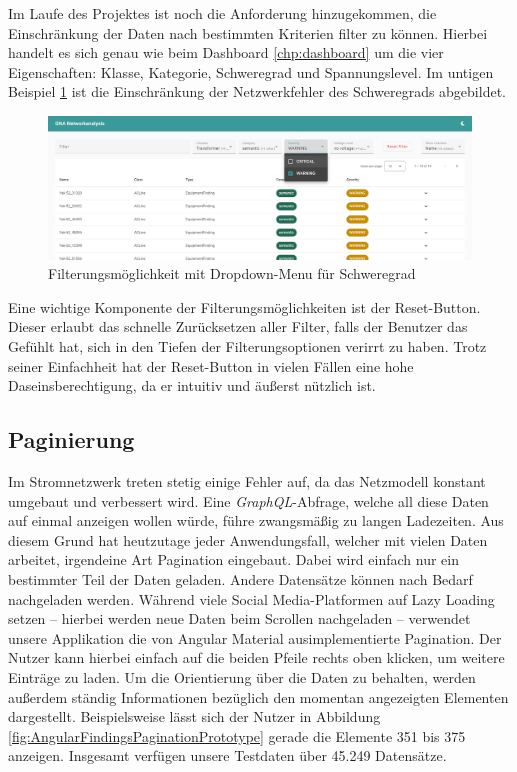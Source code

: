 Im Laufe des Projektes ist noch die Anforderung hinzugekommen, die Einschränkung der Daten nach bestimmten Kriterien filter zu können. Hierbei handelt es sich genau wie beim Dashboard \ref{chp:dashboard} um die vier Eigenschaften: Klasse, Kategorie, Schweregrad und Spannungslevel. Im untigen Beispiel \ref{fig:AngularFindingsFilteringSeverityPrototype} ist die Einschränkung der Netzwerkfehler des Schweregrads abgebildet.

\begin{figure}
    \centering
    \includegraphics[width=1\textwidth]{content/img/Empire/Frontend/Angular_Findings_Filtering_Severity_Prototype.png}
    \caption{Filterungsmöglichkeit mit Dropdown-Menu für Schweregrad}
    \label{fig:AngularFindingsFilteringSeverityPrototype}
\end{figure}
\FloatBarrier

Eine wichtige Komponente der Filterungsmöglichkeiten ist der Reset-Button. Dieser erlaubt das schnelle Zurücksetzen aller Filter, falls der Benutzer das Gefühlt hat, sich in den Tiefen der Filterungsoptionen verirrt zu haben. Trotz seiner Einfachheit hat der Reset-Button in vielen Fällen eine hohe Daseinsberechtigung, da er intuitiv und äußerst nützlich ist.

\subsection{Paginierung}

Im Stromnetzwerk treten stetig einige Fehler auf, da das Netzmodell konstant umgebaut und verbessert wird. Eine \emph{GraphQL}-Abfrage, welche all diese Daten auf einmal anzeigen wollen würde, führe zwangsmäßig zu langen Ladezeiten. Aus diesem Grund hat heutzutage jeder Anwendungsfall, welcher mit vielen Daten arbeitet, irgendeine Art Pagination eingebaut. Dabei wird einfach nur ein bestimmter Teil der Daten geladen. Andere Datensätze können nach Bedarf nachgeladen werden. Während viele Social Media-Platformen auf Lazy Loading setzen -- hierbei werden neue Daten beim Scrollen nachgeladen -- verwendet unsere Applikation die von Angular Material ausimplementierte Pagination. Der Nutzer kann hierbei einfach auf die beiden Pfeile rechts oben klicken, um weitere Einträge zu laden. Um die Orientierung über die Daten zu behalten, werden außerdem ständig Informationen bezüglich den momentan angezeigten Elementen dargestellt. Beispielsweise lässt sich der Nutzer in Abbildung \ref{fig:AngularFindingsPaginationPrototype} gerade die Elemente 351 bis 375 anzeigen. Insgesamt verfügen unsere Testdaten über 45.249 Datensätze.

